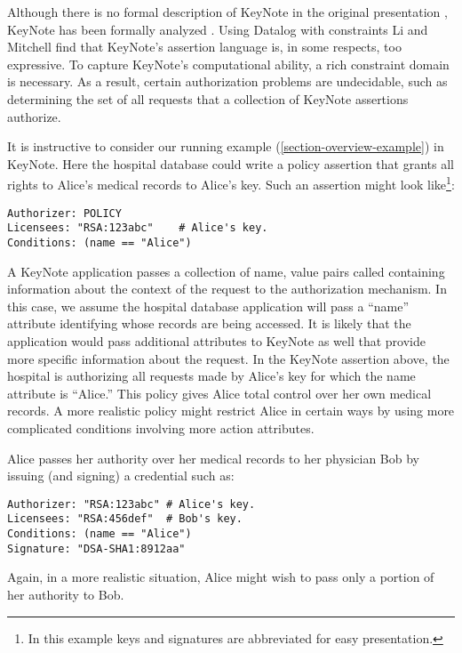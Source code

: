 Although there is no formal description of KeyNote in the original
presentation \cite{RFC-2704}, KeyNote has been formally analyzed
\cite{Weeks:UTMS,Li:DCFTML}. Using Datalog with constraints Li and
Mitchell find that KeyNote's assertion language is, in some respects,
too expressive. To capture KeyNote's computational ability, a rich
constraint domain is necessary.  As a result, certain authorization
problems are undecidable, such as determining the set of all requests that a
collection of KeyNote assertions authorize.

It is instructive to consider our running example
(\autoref{section-overview-example}) in KeyNote. Here the hospital
database could write a policy assertion that grants all rights to
Alice's medical records to Alice's key. Such an assertion might look
like\footnote{In this example keys and signatures are abbreviated for
easy presentation.}:
\begin{verbatim}
Authorizer: POLICY
Licensees: "RSA:123abc"    # Alice's key.
Conditions: (name == "Alice")
\end{verbatim}

A KeyNote application passes a collection of name, value pairs called
 containing information about the context of the
request to the authorization mechanism. In this case, we assume the hospital
database application will pass a ``name'' attribute identifying whose
records are being accessed. It is likely that the application would pass
additional attributes to KeyNote as well that provide more specific
information about the request. In the KeyNote assertion above, the hospital
is authorizing all requests made by Alice's key for which the name
attribute is ``Alice.'' This policy gives Alice total control over her own
medical records. A more realistic policy might restrict Alice in certain
ways by using more complicated conditions involving more action attributes.

Alice passes her authority over her medical records to her physician Bob
by issuing (and signing) a credential such as:
\begin{verbatim}
Authorizer: "RSA:123abc" # Alice's key.
Licensees: "RSA:456def"  # Bob's key.
Conditions: (name == "Alice")
Signature: "DSA-SHA1:8912aa"
\end{verbatim}
Again, in a more realistic situation, Alice might wish to pass only a
portion of her authority to Bob.

